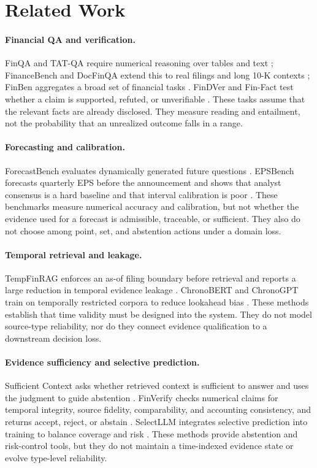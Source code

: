 \documentclass[11pt]{article}
\begin{document}
\section{Related Work}

\paragraph{Financial QA and verification.}
FinQA and TAT-QA require numerical reasoning over tables and text \citep{chen2021finqa,zhu2021tatqa}; FinanceBench and DocFinQA extend this to real filings and long 10-K contexts \citep{islam2023financebench,reddy2024docfinqa}; FinBen aggregates a broad set of financial tasks \citep{xie2024finben}. FinDVer and Fin-Fact test whether a claim is supported, refuted, or unverifiable \citep{zhao2024findver,rangapur2025finfact}. These tasks assume that the relevant facts are already disclosed. They measure reading and entailment, not the probability that an unrealized outcome falls in a range.

\paragraph{Forecasting and calibration.}
ForecastBench evaluates dynamically generated future questions \citep{karger2025forecastbench}. EPSBench forecasts quarterly EPS before the announcement and shows that analyst consensus is a hard baseline and that interval calibration is poor \citep{yin2026epsbench}. These benchmarks measure numerical accuracy and calibration, but not whether the evidence used for a forecast is admissible, traceable, or sufficient. They also do not choose among point, set, and abstention actions under a domain loss.

\paragraph{Temporal retrieval and leakage.}
TempFinRAG enforces an as-of filing boundary before retrieval and reports a large reduction in temporal evidence leakage \citep{tao2026tempfinrag}. ChronoBERT and ChronoGPT train on temporally restricted corpora to reduce lookahead bias \citep{he2026chrono}. These methods establish that time validity must be designed into the system. They do not model source-type reliability, nor do they connect evidence qualification to a downstream decision loss.

\paragraph{Evidence sufficiency and selective prediction.}
Sufficient Context asks whether retrieved context is sufficient to answer and uses the judgment to guide abstention \citep{joren2025sufficient}. FinVerify checks numerical claims for temporal integrity, source fidelity, comparability, and accounting consistency, and returns accept, reject, or abstain \citep{guan2026finverify}. SelectLLM integrates selective prediction into training to balance coverage and risk \citep{mao2025selectllm}. These methods provide abstention and risk-control tools, but they do not maintain a time-indexed evidence state or evolve type-level reliability.
\end{document}
